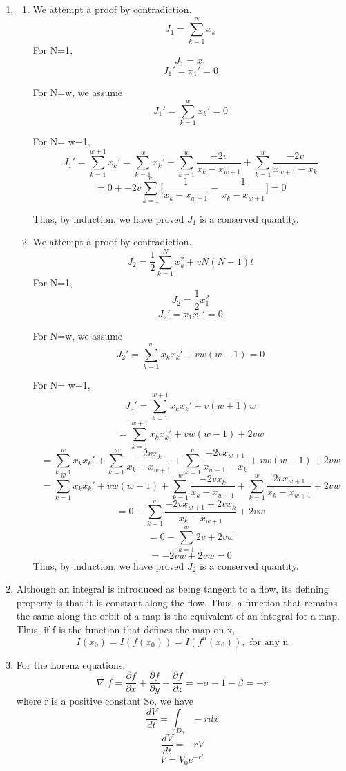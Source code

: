 \documentclass[a4paper,12pt]{article}
\begin{document}
\begin{enumerate}
	
	\item
	\begin{enumerate}
		\item 
		We attempt a proof by contradiction.
		\[J_1 = \sum_{k=1}^{N}x_k\]
		For N=1,
			\[J_1 = x_1\]
			\[J_1'= x_1' = 0\]
			
	For N=w,
	we assume
\[ J_1' = \sum_{k=1}^{w}x_k' = 0\]

For N= w+1,
\[ J_1' = \sum_{k=1}^{w+1}x_k' = \sum_{k=1}^{w}x_k' +  \sum_{k=1}^{w} \frac{-2v}{x_k -x_{w+1}} +  \sum_{k=1}^{w} \frac{-2v}{x_{w+1}-x_{k} } \]
\[ = 0 +  -2v\sum_{k=1}^{w} \bigg[\frac{1}{x_k -x_{w+1}} -  \frac{1}{x_{k}-x_{w+1} }\bigg] = 0 \]

Thus, by induction, we have proved $J_1$ is a conserved quantity.

\item 
We attempt a proof by contradiction.
\[J_2 = \frac{1}{2}\sum_{k=1}^{N}x_k^2 + vN(N-1)t\]
For N=1,
\[J_2 = \frac{1}{2}x_1^2 \]
\[J_2'= x_1 x_1' = 0\]

For N=w,
we assume
\[ J_2' = \sum_{k=1}^{w}x_k x_k' + vw(w-1) = 0\]

For N= w+1,
\[ J_2' = \sum_{k=1}^{w+1}x_k x_k' + v(w+1)w \]\[ = \sum_{k=1}^{w+1}x_k x_k' + vw(w-1)+2vw\]
\[ = \sum_{k=1}^{w}x_kx_k' +  \sum_{k=1}^{w} \frac{-2vx_k}{x_k -x_{w+1}} +  \sum_{k=1}^{w} \frac{-2vx_{w+1}}{x_{w+1}-x_{k} } + vw(w-1)+2vw\]
\[ = \sum_{k=1}^{w}x_kx_k'  + vw(w-1) +  \sum_{k=1}^{w} \frac{-2vx_k}{x_k -x_{w+1}} +  \sum_{k=1}^{w} \frac{2vx_{w+1}}{x_k -x_{w+1} } +2vw\]
\[= 0 -  \sum_{k=1}^{w} \frac{-2vx_{w+1}+2vx_k}{x_k -x_{w+1} } +2vw \]
\[= 0 -  \sum_{k=1}^{w} 2v +2vw \]
\[=-2vw+2vw =0\]
Thus, by induction, we have proved $J_2$ is a conserved quantity.
		
	\end{enumerate}
	\item
	Although an integral is introduced as being tangent to a flow, its defining property is that it is constant along the flow.
	Thus, a function that remains the same along the orbit of a map is the equivalent of an integral for a map.
	Thus, if f is the function that defines the map on x, \[I(x_0)= I(f(x_0))= I(f^n(x_0)), \text{ for any n}\]
		\item
		For the Lorenz equations,
		\[\nabla . f = \frac{\partial f}{\partial x} + \frac{\partial f}{\partial y} + \frac{\partial f}{\partial z}= -\sigma -1 - \beta  = -r \]
		where r is a positive constant
		So, we have 
		\[\frac{dV}{dt}= \int_{D_0}-r dx \]
		\[\frac{dV}{dt}= -r V \]
		\[V= V_0 e^{-rt}\]
		

\end{enumerate}
\end{document}
